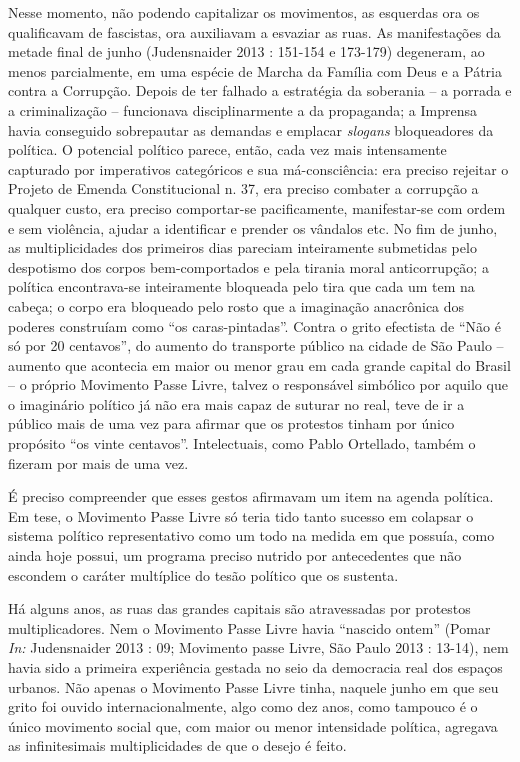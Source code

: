 Nesse momento, não podendo capitalizar os movimentos, as esquerdas ora
os qualificavam de fascistas, ora auxiliavam a esvaziar as ruas. As
manifestações da metade final de junho (Judensnaider 2013 : 151-154 e
173-179) degeneram, ao menos parcialmente, em uma espécie de Marcha da
Família com Deus e a Pátria contra a Corrupção. Depois de ter falhado a
estratégia da soberania -- a porrada e a criminalização -- funcionava
disciplinarmente a da propaganda; a Imprensa havia conseguido
sobrepautar as demandas e emplacar \emph{slogans }bloqueadores da
política. O potencial político parece, então, cada vez mais intensamente
capturado por imperativos categóricos e sua má-consciência: era preciso
rejeitar o Projeto de Emenda Constitucional n. 37, era preciso combater
a corrupção a qualquer custo, era preciso comportar-se pacificamente,
manifestar-se com ordem e sem violência, ajudar a identificar e prender
os vândalos etc. No fim de junho, as multiplicidades dos primeiros dias
pareciam inteiramente submetidas pelo despotismo dos corpos
bem-comportados e pela tirania moral anticorrupção; a política
encontrava-se inteiramente bloqueada pelo tira que cada um tem na
cabeça; o corpo era bloqueado pelo rosto que a imaginação anacrônica dos
poderes construíam como ``os caras-pintadas''. Contra o grito efectista
de ``Não é só por 20 centavos'', do aumento do transporte público na
cidade de São Paulo -- aumento que acontecia em maior ou menor grau em
cada grande capital do Brasil -- o próprio Movimento Passe Livre, talvez
o responsável simbólico por aquilo que o imaginário político já não era
mais capaz de suturar no real, teve de ir a público mais de uma vez para
afirmar que os protestos tinham por único propósito ``os vinte
centavos''. Intelectuais, como Pablo Ortellado, também o fizeram por
mais de uma vez.

É preciso compreender que esses gestos afirmavam um item na agenda
política. Em tese, o Movimento Passe Livre só teria tido tanto sucesso
em colapsar o sistema político representativo como um todo na medida em
que possuía, como ainda hoje possui, um programa preciso nutrido por
antecedentes que não escondem o caráter multíplice do tesão político que
os sustenta.

Há alguns anos, as ruas das grandes capitais são atravessadas por
protestos multiplicadores. Nem o Movimento Passe Livre havia ``nascido
ontem'' (Pomar \emph{In: }Judensnaider 2013 : 09; Movimento passe Livre,
São Paulo 2013 : 13-14), nem havia sido a primeira experiência gestada
no seio da democracia real dos espaços urbanos. Não apenas o Movimento
Passe Livre tinha, naquele junho em que seu grito foi ouvido
internacionalmente, algo como dez anos, como tampouco é o único
movimento social que, com maior ou menor intensidade política, agregava
as infinitesimais multiplicidades de que o desejo é feito.

